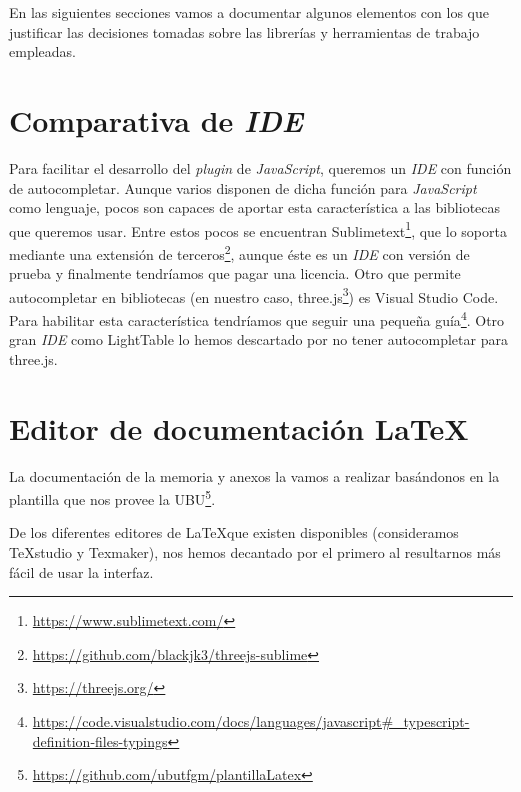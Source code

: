 
En las siguientes secciones vamos a documentar algunos elementos con los que justificar las decisiones tomadas sobre las librerías y herramientas de trabajo empleadas.

\section{Comparativa de \textit{IDE}}
Para facilitar el desarrollo del \textit{plugin} de \textit{JavaScript}, queremos un \textit{IDE} con función de autocompletar. Aunque varios disponen de dicha función para \textit{JavaScript} como lenguaje, pocos son capaces de aportar esta característica a las bibliotecas que queremos usar. Entre estos pocos se encuentran Sublimetext\footnote{\url{https://www.sublimetext.com/}}, que lo soporta mediante una extensión de terceros\footnote{\url{https://github.com/blackjk3/threejs-sublime}}, aunque éste es un \textit{IDE} con versión de prueba y finalmente tendríamos que pagar una licencia. Otro que permite autocompletar en bibliotecas (en nuestro caso, three.js\footnote{\url{https://threejs.org/}}) es Visual Studio Code. Para habilitar esta característica  tendríamos que seguir una pequeña guía\footnote{\url{https://code.visualstudio.com/docs/languages/javascript\#_typescript-definition-files-typings}}. Otro gran \textit{IDE} como LightTable lo hemos descartado por no tener autocompletar para three.js.

\section{Editor de documentación \LaTeX}
La documentación de la memoria y anexos la vamos a realizar basándonos en la plantilla que nos provee la UBU\footnote{\url{https://github.com/ubutfgm/plantillaLatex}}.

De los diferentes editores de \LaTeX que existen disponibles (consideramos TeXstudio y Texmaker), nos hemos decantado por el primero al resultarnos más fácil de usar la interfaz.

